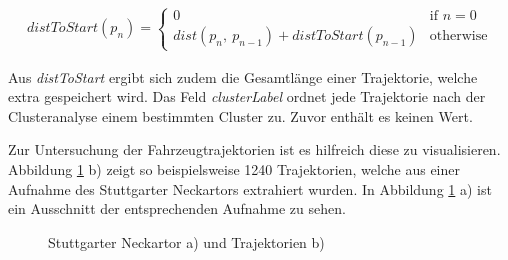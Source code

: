 \begin{ceqn}
\begin{align}
\label{eq_real_distToStart}
    distToStart(p_n) =
    \begin{cases}
        0 & \text{if } n = 0 \\
        dist(p_n,\ p_{n-1}) + distToStart(p_{n-1}) & \text{otherwise}
    \end{cases}
\end{align}
\end{ceqn}

Aus \textit{distToStart} ergibt sich zudem die Gesamtlänge einer Trajektorie, welche extra gespeichert wird.
Das Feld \textit{clusterLabel} ordnet jede Trajektorie nach der Clusteranalyse einem bestimmten Cluster zu.
Zuvor enthält es keinen Wert.

Zur Untersuchung der Fahrzeugtrajektorien ist es hilfreich diese zu visualisieren. Abbildung \ref{fig:real_neckartor} b)
zeigt so beispielsweise 1240 Trajektorien, welche aus einer Aufnahme des Stuttgarter Neckartors extrahiert wurden.
In Abbildung \ref{fig:real_neckartor} a) ist ein Ausschnitt der entsprechenden Aufnahme zu sehen.

\begin{figure}[H]
    \centering
    \caption{Stuttgarter Neckartor a) und Trajektorien b)}
    \label{fig:real_neckartor}
\end{figure}

